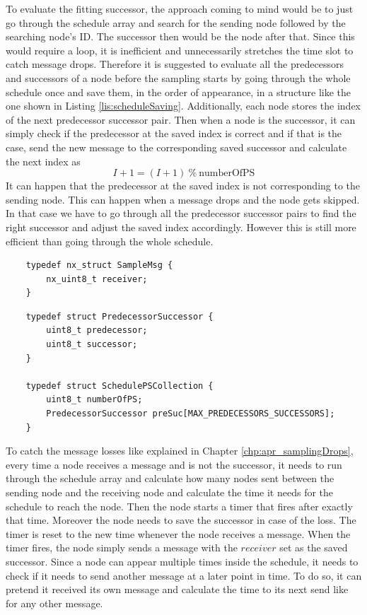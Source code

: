 To evaluate the fitting successor, the approach coming to mind would be to just go through the schedule array and search for the sending node followed by the searching node's ID. The successor then would be the node after that. Since this would require a loop, it is inefficient and unnecessarily stretches the time slot to catch message drops. Therefore it is suggested to evaluate all the predecessors and successors of a node before the sampling starts by going through the whole schedule once and save them, in the order of appearance, in a structure like the one shown in Listing \ref{lis:scheduleSaving}. Additionally, each node stores the index of the next predecessor successor pair. Then when a node is the successor, it can simply check if the predecessor at the saved index is correct and if that is the case, send the new message to the corresponding saved successor and calculate the next index as
\[ I+1 = (I + 1)\ \%\ \mbox{numberOfPS}\]      
It can happen that the predecessor at the saved index is not corresponding to the sending node. This can happen when a message drops and the node gets skipped.
In that case we have to go through all the predecessor successor pairs to find the right successor and adjust the saved index accordingly. However this is still more efficient than going through the whole schedule.

\begin{lstlisting}
	typedef nx_struct SampleMsg {
		nx_uint8_t receiver;
	}
\end{lstlisting} 

\begin{lstlisting}
	typedef struct PredecessorSuccessor {
		uint8_t predecessor;
		uint8_t successor;
	}

	typedef struct SchedulePSCollection {
		uint8_t numberOfPS;
		PredecessorSuccessor preSuc[MAX_PREDECESSORS_SUCCESSORS]; 
	}
\end{lstlisting}

To catch the message losses like explained in Chapter \ref{chp:apr_samplingDrops}, every time a node receives a message and is not the successor, it needs to run through the schedule array and calculate how many nodes sent between the sending node and the receiving node and calculate the time it needs for the schedule to reach the node. Then the node starts a timer that fires after exactly that time. Moreover the node needs to save the successor in case of the loss. The timer is reset to the new time whenever the node receives a message. When the timer fires, the node simply sends a message with the $receiver$ set as the saved successor. Since a node can appear multiple times inside the schedule, it needs to check if it needs to send another message at a later point in time. To do so, it can pretend it received its own message and calculate the time to its next send like for any other message.  